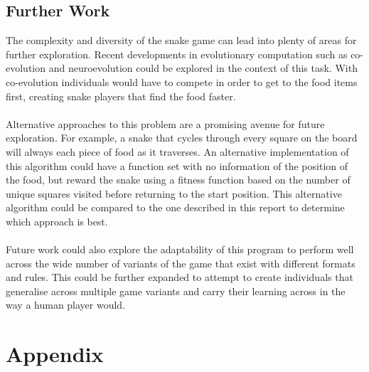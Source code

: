 \documentclass{article}
\begin{document}
\subsection{Further Work}
The complexity and diversity of the snake game can lead into plenty of areas for further exploration. Recent developments in evolutionary computation such as co-evolution and neuroevolution could be explored in the context of this task. With co-evolution individuals would have to compete in order to get to the food items first, creating snake players that find the food faster.
\\\\
Alternative approaches to this problem are a promising avenue for future exploration. For example, a snake that cycles through every square on the board will always each piece of food as it traverses. An alternative implementation of this algorithm could have a function set with no information of the position of the food, but reward the snake using a fitness function based on the number of unique squares visited before returning to the start position. This alternative algorithm could be compared to the one described in this report to determine which approach is best.
\\\\
Future work could also explore the adaptability of this program to perform well across the wide number of variants of the game that exist with different formats and rules. This could be further expanded to attempt to create individuals that generalise across multiple game variants and carry their learning across in the way a human player would.

\newpage
\raggedright
{}


\newpage
\section{Appendix}
\end{document}
